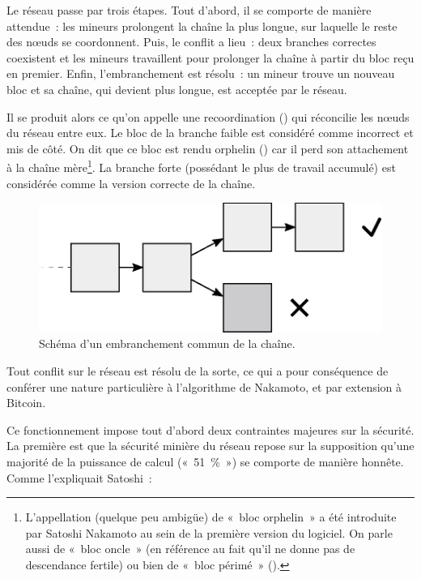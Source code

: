 Le réseau passe par trois étapes. Tout d'abord, il se comporte de manière attendue~: les mineurs prolongent la chaîne la plus longue, sur laquelle le reste des nœuds se coordonnent. Puis, le conflit a lieu~: deux branches correctes coexistent et les mineurs travaillent pour prolonger la chaîne à partir du bloc reçu en premier. Enfin, l'embranchement est résolu~: un mineur trouve un nouveau bloc et sa chaîne, qui devient plus longue, est acceptée par le réseau.

Il se produit alors ce qu'on appelle une recoordination () qui réconcilie les nœuds du réseau entre eux. Le bloc de la branche faible est considéré comme incorrect et mis de côté. On dit que ce bloc est rendu orphelin () car il perd son attachement à la chaîne mère\footnote{L'appellation (quelque peu ambigüe) de «~bloc orphelin~» a été introduite par Satoshi Nakamoto au sein de la première version du logiciel. On parle aussi de «~bloc oncle~» (en référence au fait qu'il ne donne pas de descendance fertile) ou bien de «~bloc périmé~» ().}. La branche forte (possédant le plus de travail accumulé) est considérée comme la version correcte de la chaîne.

\begin{figure}[h]
  \centering
  \includegraphics[scale=0.8]{img/blockchain-common-fork.eps}
  \caption{Schéma d'un embranchement commun de la chaîne.}
  \label{fig:blockchain-common-fork}
\end{figure}

Tout conflit sur le réseau est résolu de la sorte, ce qui a pour conséquence de conférer une nature particulière à l'algorithme de Nakamoto, et par extension à Bitcoin.



Ce fonctionnement impose tout d'abord deux contraintes majeures sur la sécurité. La première est que la sécurité minière du réseau repose sur la supposition qu'une majorité de la puissance de calcul («~51~\%~») se comporte de manière honnête. Comme l'expliquait Satoshi~:

